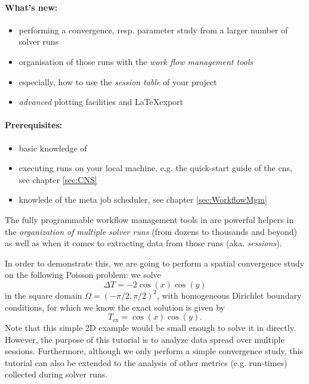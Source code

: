 
\graphicspath{{convergenceStudyTutorial/convStudy.texbatch/}}

\paragraph{What's new:} 
\begin{itemize}
	\item performing a convergence, resp. parameter study from a larger number of solver runs
	\item organisation of those runs with the\emph{ work flow management tools}
    \item especially, how to use the \emph{session table} of your project
	\item \emph{advanced} plotting facilities and \LaTeX export
\end{itemize}

\paragraph{Prerequisites:} 
\begin{itemize}
	\item basic knowledge of \BoSSSpad{}
	\item executing runs on your local machine, e.g. the quick-start guide of the \ac{cns}, see chapter \ref{sec:CNS}
    \item knowlede of the meta job scheduler, see chapter \ref{sec:WorkflowMgm}
\end{itemize}

The fully programmable workflow management tools in \BoSSS{} are powerful helpers in
the \emph{organization of multiple solver runs} (from dozens to thousands and beyond)
as well as when it comes to extracting data from those runs (aka. \emph{sessions}).

In order to demonstrate this, 
we are going to perform a spatial convergence study on the following Poisson problem:
we solve
\begin{equation*}
   \Delta T = -2 \cos(x) \cos(y)
\end{equation*}
in the square domain $\Omega = (-\pi/2,\pi/2)^2$, 
with homogeneous Dirichlet boundary conditions, 
for which we know the exact
solution is given by
\[
   T_\text{ex} = \cos(x) \cos(y) .
\]
Note that this simple 2D example would be small enough to solve it in \BoSSSpad{} directly.
However, the purpose of this tutorial is to analyze data spread over multiple sessions.
Furthermore, although we only perform a simple convergence study,
this tutorial can also be extended to the analysis of other metrics (e.g. run-times) collected during 
solver runs.

